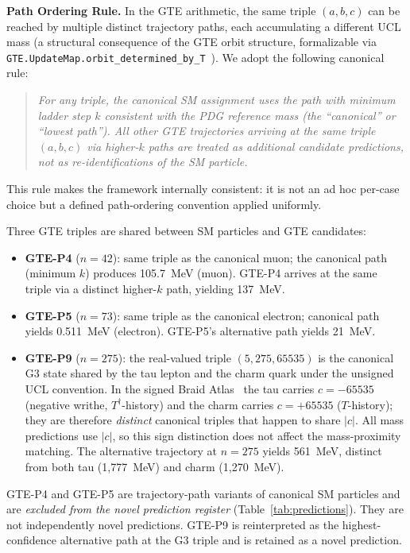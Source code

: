 \documentclass[12pt]{article}
\numberwithin{equation}{section}
\begin{document}
\textbf{Path Ordering Rule.} In the GTE arithmetic, the same triple $(a,b,c)$ can be reached by multiple distinct trajectory paths, each accumulating a different UCL mass
(a structural consequence of the GTE orbit structure, formalizable via
{\small\texttt{GTE.UpdateMap.\allowbreak orbit\_determined\_by\_T}}~\cite{ugp-lean}).
We adopt the following canonical rule:
\begin{quote}
\emph{For any triple, the canonical SM assignment uses the path with minimum ladder step $k$ consistent with the PDG reference mass (the ``canonical'' or ``lowest path''). All other GTE trajectories arriving at the same triple $(a,b,c)$ via higher-$k$ paths are treated as additional candidate predictions, not as re-identifications of the SM particle.}
\end{quote}
This rule makes the framework internally consistent: it is not an ad hoc per-case choice but a defined path-ordering convention applied uniformly.

\medskip
Three GTE triples are shared between SM particles and GTE candidates:

\begin{itemize}[nosep]
\item \textbf{GTE-P4} ($n{=}42$): same triple as the canonical muon; the canonical path (minimum $k$) produces 105.7~MeV (muon). GTE-P4 arrives at the same triple via a distinct higher-$k$ path, yielding 137~MeV.
\item \textbf{GTE-P5} ($n{=}73$): same triple as the canonical electron; canonical path yields 0.511~MeV (electron). GTE-P5's alternative path yields 21~MeV.
\item \textbf{GTE-P9} ($n{=}275$): the real-valued triple $(5,275,65535)$ is the canonical G3 state shared by the tau lepton and the charm quark under the unsigned UCL convention.  In the signed Braid Atlas~\cite{SpivackBraidAtlas} the tau carries $c = -65535$ (negative writhe, $T^\dagger$-history) and the charm carries $c = +65535$ ($T$-history); they are therefore \emph{distinct} canonical triples that happen to share $|c|$.  All mass predictions use $|c|$, so this sign distinction does not affect the mass-proximity matching.  The alternative trajectory at $n{=}275$ yields 561~MeV, distinct from both tau (1,777~MeV) and charm (1,270~MeV).
\end{itemize}

GTE-P4 and GTE-P5 are trajectory-path variants of canonical SM particles and are \emph{excluded from the novel prediction register} (Table~\ref{tab:predictions}). They are not independently novel predictions. GTE-P9 is reinterpreted as the highest-confidence alternative path at the G3 triple and is retained as a novel prediction.
\end{document}
